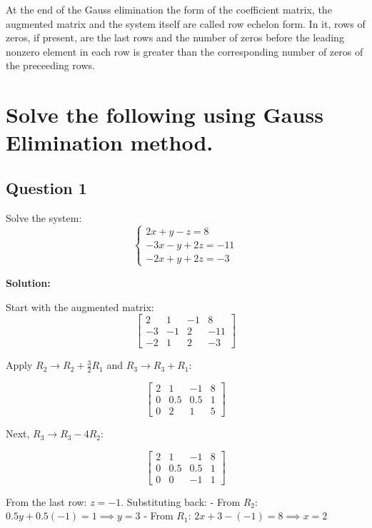 \documentclass[
  letterpaper,
  DIV=11,
  numbers=noendperiod]{scrreprt}
\begin{document}
At the end of the Gauss elimination the form of the coefficient matrix,
the augmented matrix and the system itself are called row echelon form.
In it, rows of zeros, if present, are the last rows and the number of
zeros before the leading nonzero element in each row is greater than the
corresponding number of zeros of the preceeding rows.

\section{Solve the following using Gauss Elimination
method.}\label{solve-the-following-using-gauss-elimination-method.}

\subsection{Question 1}\label{question-1}

Solve the system: \[
\begin{cases}
2x + y - z = 8 \\
-3x - y + 2z = -11 \\
-2x + y + 2z = -3
\end{cases}
\]

\textbf{Solution:}

Start with the augmented matrix: \[
\begin{bmatrix}
2 & 1 & -1 & 8 \\
-3 & -1 & 2 & -11 \\
-2 & 1 & 2 & -3
\end{bmatrix}
\]

Apply \(R_2 \rightarrow R_2 + \frac{3}{2}R_1\) and
\(R_3 \rightarrow R_3 + R_1\):

\[
\begin{bmatrix}
2 & 1 & -1 & 8 \\
0 & 0.5 & 0.5 & 1 \\
0 & 2 & 1 & 5
\end{bmatrix}
\]

Next, \(R_3 \rightarrow R_3 - 4R_2\):

\[
\begin{bmatrix}
2 & 1 & -1 & 8 \\
0 & 0.5 & 0.5 & 1 \\
0 & 0 & -1 & 1
\end{bmatrix}
\]

From the last row: \(z = -1\). Substituting back: - From \(R_2\):
\(0.5y + 0.5(-1) = 1 \implies y = 3\) - From \(R_1\):
\(2x + 3 - (-1) = 8 \implies x = 2\)
\end{document}

